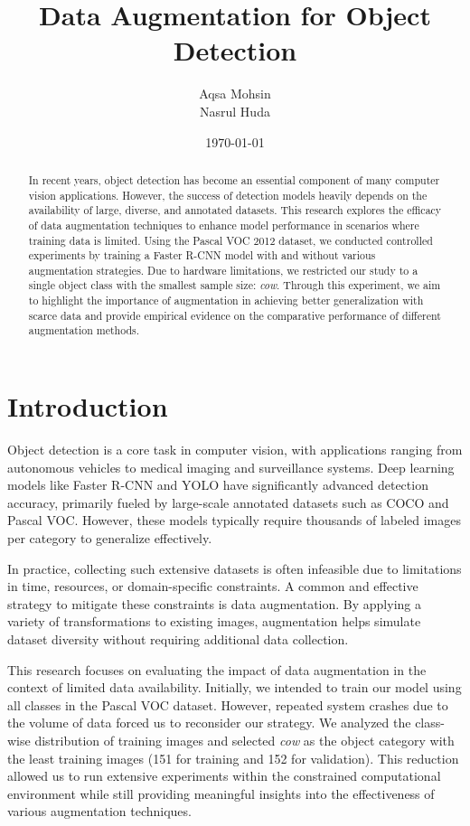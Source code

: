 \documentclass[12pt]{article}
\title{Data Augmentation for Object Detection}
\author{Aqsa Mohsin \\ Nasrul Huda}
\date{\today}
\begin{document}
\maketitle

\begin{abstract}
In recent years, object detection has become an essential component of many computer vision applications. However, the success of detection models heavily depends on the availability of large, diverse, and annotated datasets. This research explores the efficacy of data augmentation techniques to enhance model performance in scenarios where training data is limited. Using the Pascal VOC 2012 dataset, we conducted controlled experiments by training a Faster R-CNN model with and without various augmentation strategies. Due to hardware limitations, we restricted our study to a single object class with the smallest sample size: \emph{cow}. Through this experiment, we aim to highlight the importance of augmentation in achieving better generalization with scarce data and provide empirical evidence on the comparative performance of different augmentation methods.
\end{abstract}

\section{Introduction}
Object detection is a core task in computer vision, with applications ranging from autonomous vehicles to medical imaging and surveillance systems. Deep learning models like Faster R-CNN and YOLO have significantly advanced detection accuracy, primarily fueled by large-scale annotated datasets such as COCO and Pascal VOC. However, these models typically require thousands of labeled images per category to generalize effectively.

In practice, collecting such extensive datasets is often infeasible due to limitations in time, resources, or domain-specific constraints. A common and effective strategy to mitigate these constraints is data augmentation. By applying a variety of transformations to existing images, augmentation helps simulate dataset diversity without requiring additional data collection.

This research focuses on evaluating the impact of data augmentation in the context of limited data availability. Initially, we intended to train our model using all classes in the Pascal VOC dataset. However, repeated system crashes due to the volume of data forced us to reconsider our strategy. We analyzed the class-wise distribution of training images and selected \emph{cow} as the object category with the least training images (151 for training and 152 for validation). This reduction allowed us to run extensive experiments within the constrained computational environment while still providing meaningful insights into the effectiveness of various augmentation techniques.
\end{document}
